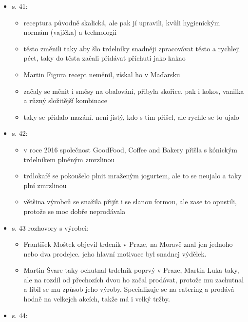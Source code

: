 \begin{itemize}
\begin{itemize}
    \begin{itemize}
    \tightlist
    \item
      trdlokafé a Martin Figura nestaví svůj marketing na označení
      tradiční nebo staročeský, vnímají to jako marketing ze strany
      ostatních prodejců
    \item
      místo toho se zaměřujou na inovace
    \item
      podle Martina Luky na festivalech není čas na přípravu různejch
      posypek a náplní, takže se tam prodává jen jeden typ, co má v sobě
      směs různejch příchutí
    \end{itemize}
  \item
    s. 41:

    \begin{itemize}
    \tightlist
    \item
      receptura původně skalická, ale pak jí upravili, kvůli hygienickým
      normám (vajíčka) a technologii
    \item
      těsto změnili taky aby šlo trdelníky snadněji zpracovávat těsto a
      rychleji péct, taky do těsta začali přidávat příchuti jako kakao
    \item
      Martin Figura recept neměnil, získal ho v Maďarsku
    \item
      začaly se měnit i směsy na obalování, přibyla skořice, pak i
      kokos, vanilka a různý složitější kombinace
    \item
      taky se přidalo mazání. není jistý, kdo s tím přišel, ale rychle
      se to ujalo
    \end{itemize}
  \item
    s. 42:

    \begin{itemize}
    \tightlist
    \item
      v roce 2016 společnost GoodFood, Coffee and Bakery přišla s
      kónickým trdelníkem plněným zmrzlinou
    \item
      trdlokafé se pokoušelo plnit mraženým jogurtem, ale to se neujalo
      a taky plní zmrzlinou
    \item
      většina výrobců se snažila přijít i se slanou formou, ale zase to
      opustili, protože se moc dobře neprodávala
    \end{itemize}
  \item
    s. 43 rozhovory s výrobci:

    \begin{itemize}
    \tightlist
    \item
      František Moštek objevil trdeník v Praze, na Moravě znal jen
      jednoho nebo dva prodejce. jeho hlavní motivace byl snadnej
      výdělek.
    \item
      Martin Švarc taky ochutnal trdelník poprvý v Praze, Martin Luka
      taky, ale na rozdíl od přechozích dvou ho začal prodávat, protože
      mu zachutnal a líbil se mu způsob jeho výroby. Specializuje se na
      catering a prodává hodně na velkejch akcích, takže má i velký
      tržby.
    \end{itemize}
  \item
    s. 44:


\end{itemize}
\end{itemize}
